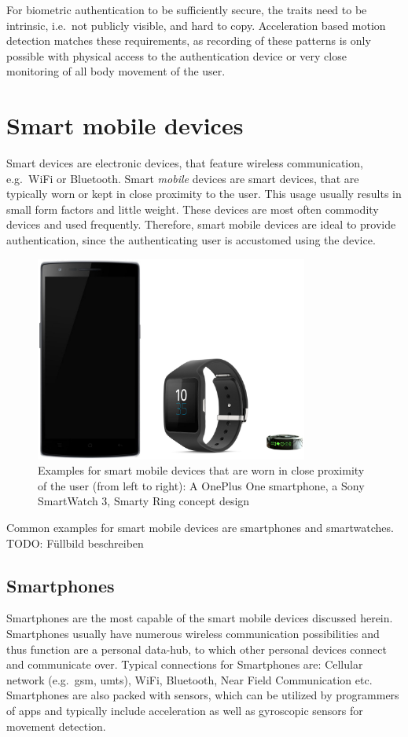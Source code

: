 For biometric authentication to be sufficiently secure, the traits need to be intrinsic, i.e.\ not publicly visible, and hard to copy. Acceleration based motion detection matches these requirements, as recording of these patterns is only possible with physical access to the authentication device or very close monitoring of all body movement of the user.

\section{Smart mobile devices}
Smart devices are electronic devices, that feature wireless communication, e.g.\ WiFi or Bluetooth. Smart \emph{mobile} devices are smart devices, that are typically worn or kept in close proximity to the user. This usage usually results in small form factors and little weight. These devices are most often commodity devices and used frequently. Therefore, smart mobile devices are ideal to provide authentication, since the authenticating user is accustomed using the device.

\begin{figure}
    \centering
    \includegraphics[width=0.8\textwidth]{figures/SmartDevices.png}
    \caption{Examples for smart mobile devices that are worn in close proximity of the user (from left to right): A OnePlus One smartphone, a Sony SmartWatch 3, Smarty Ring concept design}
    \label{fig:smartdevices}
\end{figure}
Common examples for smart mobile devices are smartphones and smartwatches.
TODO: Füllbild beschreiben

\subsection{Smartphones}
Smartphones are the most capable of the smart mobile devices discussed herein. Smartphones usually have numerous wireless communication possibilities and thus function are a personal data-hub, to which other personal devices connect and communicate over. Typical connections for Smartphones are: Cellular network (e.g.\ \acrshort{gsm}, \acrshort{umts}), WiFi, Bluetooth, Near Field Communication etc. Smartphones are also packed with sensors, which can be utilized by programmers of \Glspl{app} and typically include acceleration as well as gyroscopic sensors for movement detection.

